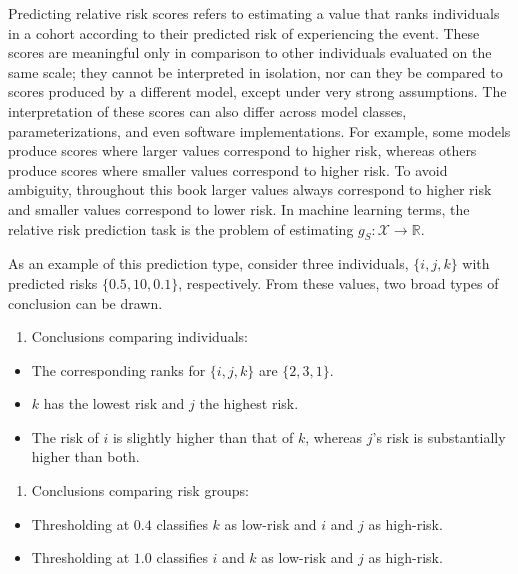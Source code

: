 \documentclass[
  letterpaper,
  krantz2]{style/krantz}
\providecommand{\tightlist}{%
  \setlength{\itemsep}{0pt}\setlength{\parskip}{0pt}}
\begin{document}
Predicting relative risk scores refers to
estimating a value that ranks individuals in a cohort according to their
predicted risk of experiencing the event. These scores are meaningful
only in comparison to other individuals evaluated on the same scale;
they cannot be interpreted in isolation, nor can they be compared to
scores produced by a different model, except under very strong
assumptions. The interpretation of these scores can also differ across
model classes, parameterizations, and even software implementations. For
example, some models produce scores where larger values correspond to
higher risk, whereas others produce scores where smaller values
correspond to higher risk. To avoid ambiguity, throughout this book
larger values always correspond to higher risk and smaller values
correspond to lower risk. In machine learning terms, the relative risk
prediction task is the problem of
estimating \(g_S: \mathcal{X}\rightarrow \mathbb{R}\).

As an example of this prediction type, consider three individuals,
\(\{i,j,k\}\) with predicted risks \(\{0.5, 10, 0.1\}\), respectively.
From these values, two broad types of conclusion can be drawn.

\begin{enumerate}
\def\labelenumi{\arabic{enumi}.}
\tightlist
\item
  Conclusions comparing individuals:
\end{enumerate}

\begin{itemize}
\tightlist
\item
  The corresponding ranks for \(\{i,j,k\}\) are \(\{2,3,1\}\).
\item
  \(k\) has the lowest risk and \(j\) the highest risk.
\item
  The risk of \(i\) is slightly higher than that of \(k\), whereas
  \(j\)'s risk is substantially higher than both.
\end{itemize}

\begin{enumerate}
\def\labelenumi{\arabic{enumi}.}
\setcounter{enumi}{1}
\tightlist
\item
  Conclusions comparing risk groups:
\end{enumerate}

\begin{itemize}
\tightlist
\item
  Thresholding at \(0.4\) classifies \(k\) as low-risk and \(i\) and
  \(j\) as high-risk.
\item
  Thresholding at \(1.0\) classifies \(i\) and \(k\) as low-risk and
  \(j\) as high-risk.
\end{itemize}
\end{document}
